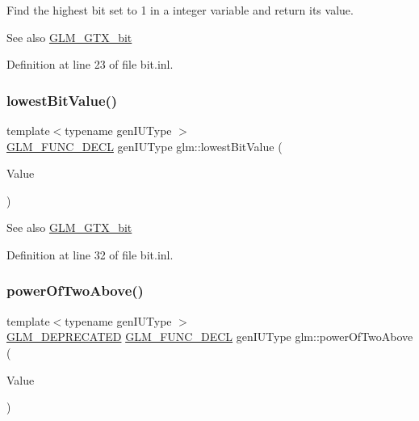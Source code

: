 Find the highest bit set to 1 in a integer variable and return its value.

\begin{DoxySeeAlso}{See also}
\mbox{\hyperlink{group__gtx__bit}{G\+L\+M\+\_\+\+G\+T\+X\+\_\+bit}} 
\end{DoxySeeAlso}


Definition at line 23 of file bit.\+inl.

\mbox{\label{group__gtx__bit_ga2ff6568089f3a9b67f5c30918855fc6f}} 
\subsubsection{\texorpdfstring{lowestBitValue()}{lowestBitValue()}}
{\footnotesize\ttfamily template$<$typename gen\+I\+U\+Type $>$ \\
\mbox{\hyperlink{setup_8hpp_ab2d052de21a70539923e9bcbf6e83a51}{G\+L\+M\+\_\+\+F\+U\+N\+C\+\_\+\+D\+E\+CL}} gen\+I\+U\+Type glm\+::lowest\+Bit\+Value (\begin{DoxyParamCaption}\item[{gen\+I\+U\+Type}]{Value }\end{DoxyParamCaption})}

\begin{DoxySeeAlso}{See also}
\mbox{\hyperlink{group__gtx__bit}{G\+L\+M\+\_\+\+G\+T\+X\+\_\+bit}} 
\end{DoxySeeAlso}


Definition at line 32 of file bit.\+inl.

\mbox{\label{group__gtx__bit_ga8cda2459871f574a0aecbe702ac93291}} 
\subsubsection{\texorpdfstring{powerOfTwoAbove()}{powerOfTwoAbove()}\hspace{0.1cm}{\footnotesize\ttfamily [1/2]}}
{\footnotesize\ttfamily template$<$typename gen\+I\+U\+Type $>$ \\
\mbox{\hyperlink{setup_8hpp_a8edfb48cdc249a3ee48406bf179023dc}{G\+L\+M\+\_\+\+D\+E\+P\+R\+E\+C\+A\+T\+ED}} \mbox{\hyperlink{setup_8hpp_ab2d052de21a70539923e9bcbf6e83a51}{G\+L\+M\+\_\+\+F\+U\+N\+C\+\_\+\+D\+E\+CL}} gen\+I\+U\+Type glm\+::power\+Of\+Two\+Above (\begin{DoxyParamCaption}\item[{gen\+I\+U\+Type}]{Value }\end{DoxyParamCaption})}

